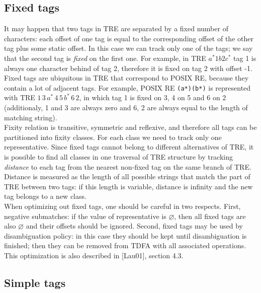 \documentclass{article}
\theoremstyle{definition}
\begin{document}
\begin{multicols}{2}
\subsection*{Fixed tags}

It may happen that two tags in TRE are separated by a fixed number of characters:
each offset of one tag is equal to the corresponding offset of the other tag plus some static offset.
In this case we can track only one of the tags; we say that the second tag is \emph{fixed} on the first one.
For example, in TRE $a^* 1 b 2 c^*$ tag 1 is always one character behind of tag 2,
therefore it is fixed on tag 2 with offset -1.
Fixed tags are ubiquitous in TRE that correspond to POSIX RE, because they contain a lot of adjacent tags.
For example, POSIX RE \texttt{(a*)(b*)} is represented with TRE $1 \, 3 \, a^* \, 4 \, 5 \, b^* \, 6 \, 2$,
in which tag 1 is fixed on 3, 4 on 5 and 6 on 2
(additionaly, 1 and 3 are always zero and 6, 2 are always equal to the length of matching string).
\\

Fixity relation is transitive, symmetric and reflexive,
and therefore all tags can be partitioned into fixity classes.
For each class we need to track only one representative.
Since fixed tags cannot belong to different alternatives of TRE,
it is possible to find all classes in one traversal of TRE structure
by tracking \emph{distance} to each tag from the nearest non-fixed tag on the same branch of TRE.
Distance is measured as the length of all possible strings that match the part of TRE between two tags:
if this length is variable, distance is infinity and the new tag belongs to a new class.
\\

When optimizing out fixed tags, one should be careful in two respects.
First, negative submatches: if the value of representative is $\varnothing$,
then all fixed tags are also $\varnothing$ and their offsets should be ignored.
Second, fixed tags may be used by disambiguation policy:
in this case they should be kept until disambiguation is finished;
then they can be removed from TDFA with all associated operations.
\\

This optimization is also described in [Lau01], section 4.3.

\subsection*{Simple tags}


\end{multicols}
\end{document}

